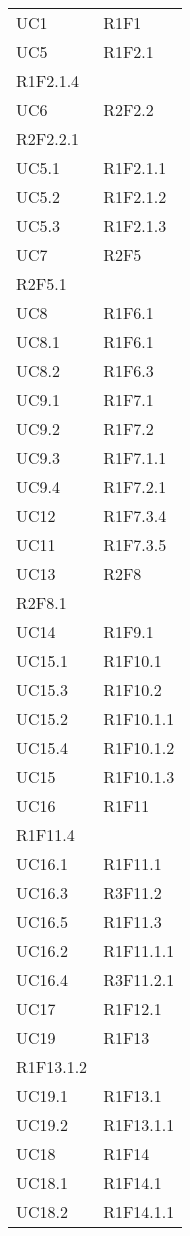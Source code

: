 \begin{longtable}{|C{6.5cm}|C{6.5cm}|}
	UC1 & R1F1 \\
	UC5 & \centering R1F2.1 \\ R1F2.1.4 \tabularnewline
	UC6 & \centering R2F2.2 \\ R2F2.2.1 \tabularnewline
	UC5.1 & R1F2.1.1 \\
	UC5.2 & R1F2.1.2 \\
	UC5.3 & R1F2.1.3 \\
	UC7 & \centering R2F5 \\ R2F5.1 \tabularnewline
	UC8 & R1F6.1 \\
	UC8.1 & R1F6.1 \\
	UC8.2 & R1F6.3 \\
	UC9.1 & R1F7.1 \\
	UC9.2 & R1F7.2 \\
	UC9.3 & R1F7.1.1 \\
	UC9.4 & R1F7.2.1 \\
	UC12 & R1F7.3.4 \\
	UC11 & R1F7.3.5 \\
	UC13 & \centering R2F8 \\ R2F8.1 \tabularnewline
	UC14 & R1F9.1 \\
	UC15.1 & R1F10.1 \\
	UC15.3 & R1F10.2 \\
	UC15.2 & R1F10.1.1 \\
	UC15.4 & R1F10.1.2 \\
	UC15 & R1F10.1.3 \\
	UC16 & \centering R1F11 \\ R1F11.4 \tabularnewline
	UC16.1 & R1F11.1 \\
	UC16.3 & R3F11.2 \\
	UC16.5 & R1F11.3 \\
	UC16.2 & R1F11.1.1 \\
	UC16.4 & R3F11.2.1 \\
	UC17 & R1F12.1 \\
	UC19 & \centering R1F13 \\ R1F13.1.2 \tabularnewline
	UC19.1 & R1F13.1 \\
	UC19.2 & R1F13.1.1 \\
	UC18 & R1F14 \\
	UC18.1 & R1F14.1 \\
	UC18.2 & R1F14.1.1 \\
	
\end{longtable}